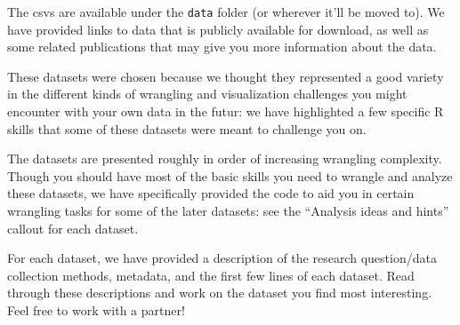 \documentclass[
  letterpaper,
  DIV=11,
  numbers=noendperiod]{scrreprt}
\begin{document}
The csvs are available under the \texttt{data} folder (or wherever it'll
be moved to). We have provided links to data that is publicly available
for download, as well as some related publications that may give you
more information about the data.

These datasets were chosen because we thought they represented a good
variety in the different kinds of wrangling and visualization challenges
you might encounter with your own data in the futur: we have highlighted
a few specific R skills that some of these datasets were meant to
challenge you on.

\begin{tcolorbox}[enhanced jigsaw, bottomtitle=1mm, bottomrule=.15mm, toprule=.15mm, opacityback=0, leftrule=.75mm, breakable, colback=white, toptitle=1mm, left=2mm, coltitle=black, titlerule=0mm, opacitybacktitle=0.6, title=\textcolor{quarto-callout-note-color}{\faInfo}\hspace{0.5em}{Note}, rightrule=.15mm, arc=.35mm, colframe=quarto-callout-note-color-frame, colbacktitle=quarto-callout-note-color!10!white]

The datasets are presented roughly in order of increasing wrangling
complexity. Though you should have most of the basic skills you need to
wrangle and analyze these datasets, we have specifically provided the
code to aid you in certain wrangling tasks for some of the later
datasets: see the ``Analysis ideas and hints'' callout for each dataset.

\end{tcolorbox}

For each dataset, we have provided a description of the research
question/data collection methods, metadata, and the first few lines of
each dataset. Read through these descriptions and work on the dataset
you find most interesting. Feel free to work with a partner!
\end{document}

